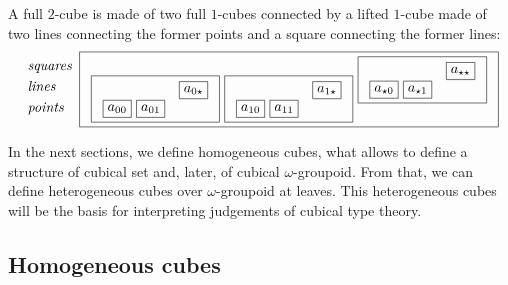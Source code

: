 \documentclass{article}
\begin{document}
A full $2$-cube is made of two full $1$-cubes connected by a lifted
$1$-cube made of two lines connecting the former points and a square
connecting the former lines:
$$
\begin{array}{lll}
\mbox{\textit{squares}}\\
[1mm]\mbox{\textit{lines}}\\
[1mm]\mbox{\textit{points}}\\
[1mm]\end{array}
\framebox{$\begin{array}{lll}
\framebox{$
\begin{array}{ll}
  & \framebox{$a_{0\star}$}\\
\framebox{$a_{00}$}~\framebox{$a_{01}$}\\
\end{array}
$}~
\framebox{$
\begin{array}{ll}
 & \framebox{$a_{1\star}$}\\
\framebox{$a_{10}$}~\framebox{$a_{11}$}\\
\end{array}
$}~
\raisebox{4.8mm}{$\framebox{$
\begin{array}{ll}
 & \framebox{$a_{\star\star}$}\\
\framebox{$a_{\star 0}$}~\framebox{$a_{\star 1}$}\\
\end{array}
$}$}
\end{array}$}
$$

In the next sections, we define homogeneous cubes, what allows to
define a structure of cubical set and, later, of cubical
$\omega$-groupoid. From that, we can define heterogeneous cubes over
$\omega$-groupoid at leaves. This heterogeneous cubes will be the
basis for interpreting judgements of cubical type theory.


\subsection{Homogeneous cubes}
\end{document}
